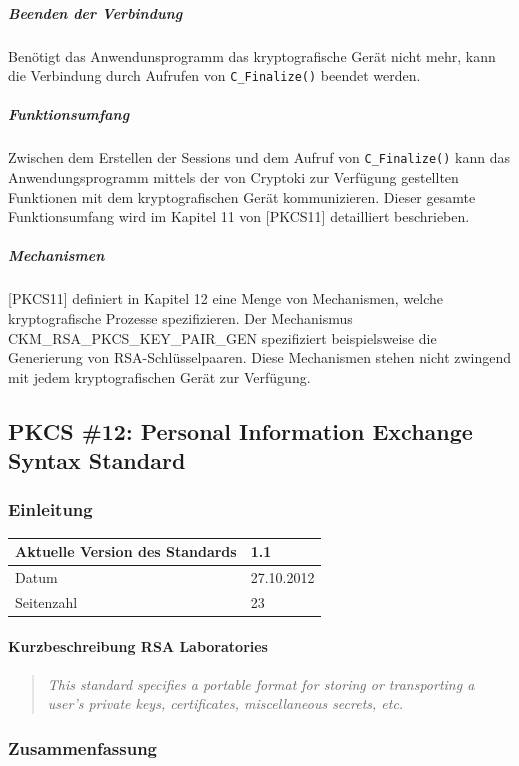 \documentclass[10pt,a4paper]{article}
\begin{document}
\subparagraph{Beenden der Verbindung}
Benötigt das Anwendunsprogramm das kryptografische Gerät nicht mehr, kann die Verbindung
durch Aufrufen von \texttt{C\_Finalize()} beendet werden.

\subparagraph{Funktionsumfang}
Zwischen dem Erstellen der Sessions und dem Aufruf von \texttt{C\_Finalize()} kann das
Anwendungsprogramm mittels der von Cryptoki zur Verfügung gestellten Funktionen mit dem
kryptografischen Gerät kommunizieren. Dieser gesamte Funktionsumfang wird im Kapitel 11
von [PKCS11] detailliert beschrieben.

\subparagraph{Mechanismen}
[PKCS11] definiert in Kapitel 12 eine Menge von Mechanismen, welche kryptografische
Prozesse spezifizieren. Der Mechanismus CKM\_RSA\_PKCS\_KEY\_PAIR\_GEN spezifiziert
beispielsweise die Generierung von RSA-Schlüsselpaaren. Diese Mechanismen stehen nicht
zwingend mit jedem kryptografischen Gerät zur Verfügung.

\subsection{PKCS \#12: Personal Information Exchange Syntax Standard}

\subsubsection{Einleitung}

\begin{table}[ht]
    \centering
    \begin{tabular}{|l|l|} \hline
        Aktuelle Version des Standards & 1.1 \\\hline
        Datum & 27.10.2012 \\\hline
        Seitenzahl & 23 \\\hline
    \end{tabular}
\end{table}

\paragraph{Kurzbeschreibung RSA Laboratories}
\begin{quotation}
    \itshape This standard specifies a portable format for storing or transporting a
    user's private keys, certificates, miscellaneous secrets, etc.
\end{quotation}

\subsubsection{Zusammenfassung}
\end{document}
